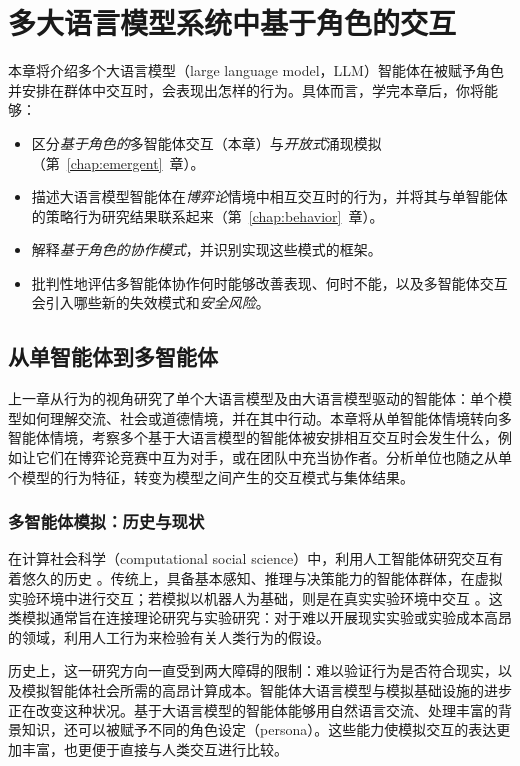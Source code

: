 \chapter{多大语言模型系统中基于角色的交互}\label{chap:roleint}\label{chap:role}

\begin{learningbox}
本章将介绍多个大语言模型（large language model，LLM）智能体在被赋予角色并安排在群体中交互时，会表现出怎样的行为。具体而言，学完本章后，你将能够：
\begin{itemize}[leftmargin=*, nosep]
    \item 区分{\em 基于角色的}多智能体交互（本章）与{\em 开放式}涌现模拟（第~\ref{chap:emergent}~章）。
    \item 描述大语言模型智能体在{\em 博弈论}情境中相互交互时的行为，并将其与单智能体的策略行为研究结果联系起来（第~\ref{chap:behavior}~章）。
    \item 解释{\em 基于角色的协作模式}，并识别实现这些模式的框架。
    \item 批判性地评估多智能体协作何时能够改善表现、何时不能，以及多智能体交互会引入哪些新的失效模式和{\em 安全风险}。
\end{itemize}
\end{learningbox}

\section{从单智能体到多智能体}
上一章从行为的视角研究了单个大语言模型及由大语言模型驱动的智能体：单个模型如何理解交流、社会或道德情境，并在其中行动。本章将从单智能体情境转向多智能体情境，考察多个基于大语言模型的智能体被安排相互交互时会发生什么，例如让它们在博弈论竞赛中互为对手，或在团队中充当协作者。分析单位也随之从单个模型的行为特征，转变为模型之间产生的交互模式与集体结果。

\subsection{多智能体模拟：历史与现状}
在计算社会科学（computational social science）中，利用人工智能体研究交互有着悠久的历史 \citep{epstein1996growing,macal_tutorial_2010}。传统上，具备基本感知、推理与决策能力的智能体群体，在虚拟实验环境中进行交互；若模拟以机器人为基础，则是在真实实验环境中交互 \citep{steels1995self,shoham2008multiagent}。这类模拟通常旨在连接理论研究与实验研究：对于难以开展现实实验或实验成本高昂的领域，利用人工行为来检验有关人类行为的假设。

历史上，这一研究方向一直受到两大障碍的限制：难以验证行为是否符合现实，以及模拟智能体社会所需的高昂计算成本。智能体大语言模型与模拟基础设施的进步 \citep{rutherford2024jaxmarl} 正在改变这种状况。基于大语言模型的智能体能够用自然语言交流、处理丰富的背景知识，还可以被赋予不同的角色设定（persona）。这些能力使模拟交互的表达更加丰富，也更便于直接与人类交互进行比较。

